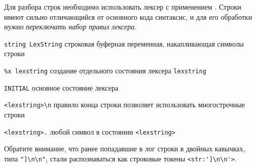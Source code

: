 \label{ministring}

Для разбора строк необходимо использовать лексер с применением
. Строки имеют сильно отличающийся от
основного кода синтаксис, и для его обработки нужно \emph{переключать набор
правил лексера}.

\label{lexstring}

\begin{description}
\item{\verb|string LexString|} строковая буферная переменная, накапливающая
символы строки
\item{\verb|%x lexstring|} создание отдельного состояния лексера
\verb|lexstring|
\item{\verb|INITIAL|} основное состояние лексера
\item{\verb|<lexstring>\n|} правило конца строки позволяет использовать
многострочные строки
\item{\verb|<lexstring>.|} любой символ в состоянии \verb|<lexstring>|
\end{description}


Обратите внимание, что ранее попадавшие в лог строки в двойных кавычках, типа
\verb|"]\n\n"|, стали распознаваться как строковые токены \verb|<str:']\n\n'>|.
